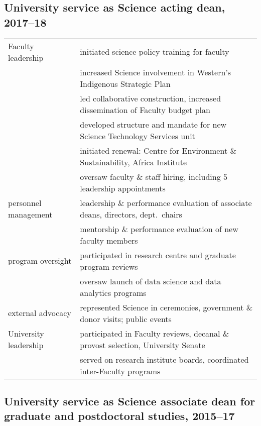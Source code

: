 \subsection{University service as Science acting dean, 2017--18}

\begin{tabularx}{\textwidth}{lX}
Faculty leadership & initiated science policy training for faculty \\
& increased Science involvement in Western's Indigenous Strategic Plan \\
& led collaborative construction, increased dissemination of Faculty budget plan\\
& developed structure and mandate for new Science Technology Services unit\\
& initiated renewal: Centre for Environment \& Sustainability, Africa Institute\\
& oversaw faculty \& staff hiring, including 5 leadership appointments \\
personnel management & leadership \& performance evaluation of associate deans, directors, dept.\ chairs\\
&mentorship  \& performance evaluation of new faculty members\\
program oversight & participated in research centre and graduate program reviews\\ 
& oversaw launch of data science and data analytics programs\\
external advocacy & represented Science in ceremonies, government \& donor visits; public events \\
University leadership  &  participated in Faculty reviews, decanal \& provost selection, University Senate \\
 & served on research institute boards, coordinated  inter-Faculty programs\\
\end{tabularx}


\vspace{0.5cm}
\subsection{University service as Science associate dean for graduate and postdoctoral studies, 2015--17}

